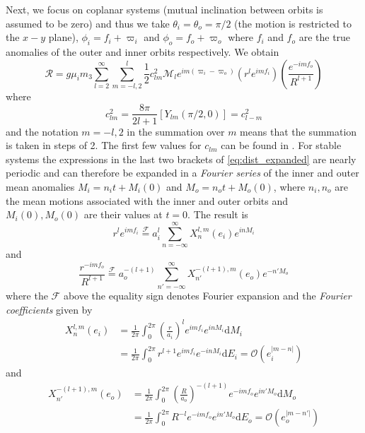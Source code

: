 \documentclass[twoside,openright,titlepage,numbers=noenddot,headinclude,%
                footinclude=true,cleardoublepage=empty,abstractoff, 
                BCOR=5mm,paper=a4,fontsize=11pt,%
                american,%
                ]{scrreprt}%
\begin{document}
Next, we focus on coplanar systems
(mutual inclination between orbits is assumed to be zero) and thus we take
$\theta_i=\theta_o=\pi/2$ (the motion is restricted to the $x-y$ plane), 
$\phi_i=f_i+\varpi_i$ and $\phi_o=f_o+\varpi_o$ where $f_i$ and $f_o$ are
the true anomalies of the outer and inner orbits respectively. We obtain 
\begin{equation}
    \mathcal{R}=g\mu_im_3\sum^\infty_{l=2}\sum^l_{m=-l,2} \frac{1}{2} c_{lm}^2\mathcal{M}_l
    e^{im(\varpi_i-\varpi_o)}\left(r^le^{imf_i}\right)\left( \frac{e^{-imf_o}}{R^{l+1}} 
    \right)
    \label{eq:dist_expanded}
\end{equation}
where
\begin{equation}
    c^2_{lm}= \frac{8\pi}{2l+1} \left[Y_{lm}(\pi/2,0)\right]=c^2_{l-m}
\end{equation}
and the notation $m=-l, 2$ in the summation over $m$ means that the summation is taken
in steps of 2. The first few values for $c_{lm}$ can be found in \citet{Mardling2013}.
For stable systems the expressions in the last two brackets of
\cref{eq:dist_expanded} are nearly periodic and can therefore be expanded in a 
\emph{Fourier series} of the inner and outer mean anomalies $M_i=n_it+M_i(0)$ and
$M_o=n_ot+M_o(0)$, where $n_i,n_o$ are the mean motions associated with the inner
and outer orbits and $M_i(0),M_o(0)$ are their values at $t=0$.  The result is
\begin{equation}
    r^le^{imf_i}\stackrel{\mathcal{F}}{=}a_i^l\sum^\infty_{n=-\infty}X^{l,m}_n(e_i)e^{inM_i}
    \label{eq:expansion_1}
\end{equation}
and
\begin{equation}
    \frac{r^{-imf_o}}{R^{l+1}} \stackrel{\mathcal{F}}{=}a_o^{-(l+1)}\sum^\infty_{n'=-\infty}
    X^{-(l+1),m}_{n'}(e_o)e^{-n'M_o}
    \label{eq:expansion_2}
\end{equation}
where the $\mathcal{F}$ above the equality sign denotes Fourier expansion 
and the \emph{Fourier coefficients} given by
\begin{equation}
    \begin{aligned}
        X^{l,m}_n(e_i)&= \frac{1}{2\pi} \int^{2\pi}_0 \left(\frac{r}{a_i}\right)^l
        e^{imf_i}e^{inM_i}\mathrm{d}M_i\\[4pt]
        &=\frac{1}{2\pi}\int^{2\pi}_0r^{l+1} e^{imf_i}e^{-inM_i}\mathrm{d}E_i
=    \mathcal{O}(e_i^{\lvert m-n\rvert})
    \label{eq:hansen_inner}
    \end{aligned}
\end{equation}
and
\begin{equation}
    \begin{aligned}
        X^{-(l+1),m}_{n'}(e_o)&= \frac{1}{2\pi} \int^{2\pi}_0 \left( \frac{R}{a_o}
        \right)^{-(l+1)}e^{-imf_o}e^{in'M_o}\mathrm{d}M_o\\[4pt]
        &=\frac{1}{2\pi}\int^{2\pi}_0R^{-l} e^{-imf_o}e^{in'M_o}\mathrm{d}E_o
        =\mathcal{O}(e_o^{\lvert m-n'\rvert})
    \end{aligned}
    \label{eq:hansen_outer}
\end{equation}
\end{document}
